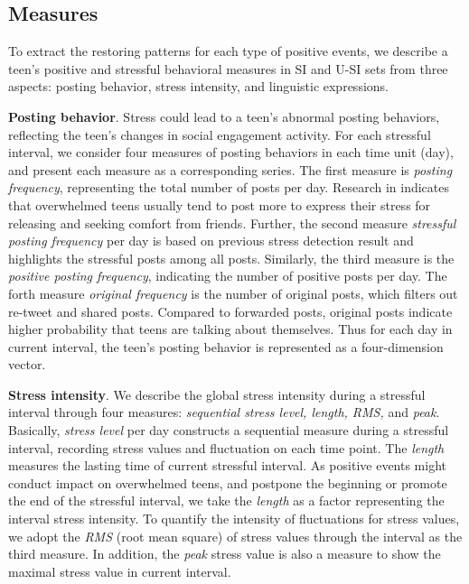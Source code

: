 \subsection{Measures}
\label{subsec:pattern}
To extract the restoring patterns  for each type of positive events,
we describe a teen's positive and stressful behavioral measures in SI and U-SI sets from three aspects:
posting behavior, stress intensity, and linguistic expressions.

\textbf{Posting behavior}.
Stress could lead to a teen's abnormal posting behaviors,
reflecting the teen's changes in social engagement activity.
For each stressful interval,
we consider four measures of posting behaviors in each time unit (day),
and present each measure as a corresponding series.
The first measure is \emph{posting frequency},
representing the total number of posts per day.
Research in \cite{Li2017Analyzing} indicates that overwhelmed teens usually tend to post more to express their stress for releasing
and seeking comfort from friends.
Further, the second measure \emph{stressful posting frequency} per day
is based on previous stress detection result and highlights the stressful posts among all posts.
Similarly, the third measure is the \emph{positive posting frequency}, indicating the number of positive posts per day.
The forth measure \emph{original frequency} is the number of original posts, which filters out re-tweet and shared posts.
Compared to forwarded posts, original posts indicate higher probability that teens are talking about themselves.
Thus for each day in current interval, the teen's posting behavior is represented as a four-dimension vector.

\textbf{Stress intensity}.
We describe the global stress intensity during a stressful interval through four measures:
\emph{sequential stress level, length, RMS,} and \emph{peak}.
Basically, \emph{stress level} per day constructs a sequential measure during a stressful interval,
recording stress values and fluctuation on each time point.
The \emph{length} measures the lasting time of current stressful interval.
As positive events might conduct impact on overwhelmed teens,
and postpone the beginning or promote the end of the stressful interval,
we take the \emph{length} as a factor representing the interval stress intensity.
To quantify the intensity of fluctuations for stress values,
we adopt the \emph{RMS} (root mean square) of stress values through the interval as the third measure.
In addition, the \emph{peak} stress value is also a measure to show the maximal stress value in current interval.

